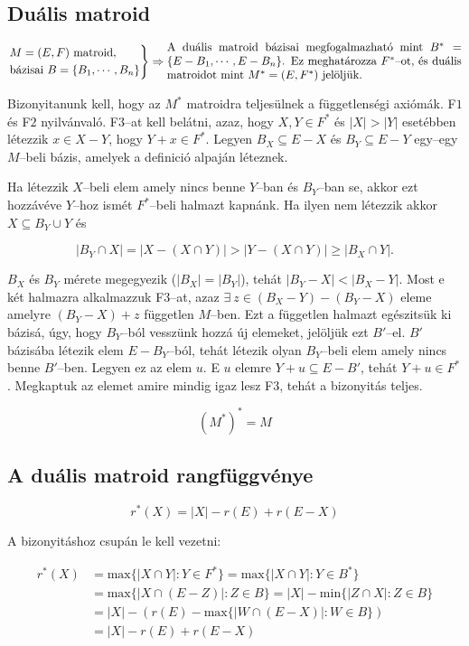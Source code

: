 \subsection{Duális matroid}

\[
\begin{rcases}
M=(E,F) \mbox{ matroid}, \\
\mbox{bázisai } B=\{B_1, \cdots, B_n\}
\end{rcases} \Rightarrow
\parbox[L]{9cm} {
A duális matroid bázisai megfogalmazható mint $B^*=\{E-B_1, \cdots, E-B_n\}$.
Ez meghatározza $F^*$--ot, és duális matroidot mint $M^*=(E,F^*)$ jelöljük.}
\]

Bizonyitanunk kell, hogy az $M^*$ matroidra teljesülnek a függetlenségi axiómák.
F$1$ és F$2$ nyilvánvaló. F$3$--at kell belátni, azaz, hogy $X,Y \in F^*$ és
$|X|>|Y|$ esetébben létezzik $x \in X-Y$, hogy $Y+x \in F^*$. Legyen $B_X
\subseteq E-X$ és $B_Y\subseteq E-Y$ egy--egy $M$--beli bázis, amelyek a
definició alpaján léteznek.

Ha létezzik $X$--beli elem amely nincs benne $Y$--ban és $B_Y$--ban se, akkor
ezt hozzávéve $Y$--hoz ismét $F^*$--beli halmazt kapnánk. Ha ilyen nem létezzik akkor 
$X \subseteq B_Y \cup Y$ és

\[
|B_Y \cap X | = |X-(X \cap Y)| > |Y - (X \cap Y)| \geq |B_X \cap Y|.
\]

$B_X$ és $B_Y$ mérete megegyezik ($|B_X|=|B_Y|$), tehát $|B_Y-X| < |B_X-Y|$.
Most e két halmazra alkalmazzuk F$3$--at, azaz $\exists~z \in (B_X-Y)-(B_Y-X)$
eleme amelyre $(B_Y-X)+z$ független $M$--ben. Ezt a független halmazt egészitsük
ki bázisá, úgy, hogy $B_Y$--ból vesszünk hozzá új elemeket, jelöljük ezt
$B'$--el. $B'$ bázisába létezik elem $E-B_Y$--ból, tehát létezik olyan $B_Y$--beli elem 
amely nincs benne $B'$--ben. Legyen ez az elem $u$. E $u$ elemre $Y+u \subseteq E - B'$,
tehát $Y+u \in F^*$. Megkaptuk az elemet amire mindig igaz lesz F$3$, tehát a bizonyitás
teljes. 

\[(M^*)^* = M \]

\subsection{A duális matroid rangfüggvénye}

\[ r^*(X) = |X|-r(E)+r(E-X)\]

A bizonyitáshoz csupán le kell vezetni:

\begin{align*}
r^*(X) &= \mbox{max} \{ |X \cap Y| : Y \in F^*\}   = \mbox{max} \{ |X \cap Y| : Y \in B^*\}\\
       &= \mbox{max} \{ |X \cap (E-Z)| : Z \in B\} = |X| - \mbox{min} \{ |Z \cap X| : Z \in B\}\\
       &= |X| - (r(E)-\mbox{max}\{|W \cap (E-X)| : W \in B\}) \\
       &= |X| - r(E) + r(E-X)
\end{align*}